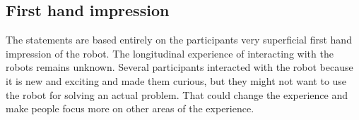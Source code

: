 \subsection{First hand impression}
The statements are based entirely on the participants very superficial first hand impression of the robot. The longitudinal experience of interacting with the robots remains unknown. Several participants interacted with the robot because it is new and exciting and made them curious, but they might not want to use the robot for solving an actual problem. That could change the experience and make people focus more on other areas of the experience.